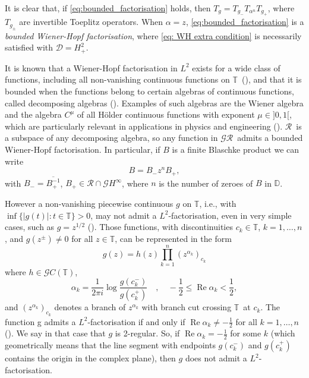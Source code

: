 \documentclass[12pt]{elsarticle}
\numberwithin{equation}{section}
\theoremstyle{plain}
\newcommand{\Hp}{\ensuremath{H^2_+}}
\newcommand{\Hinf}{\ensuremath{H^\infty}}
\newcommand{\TT}{\ensuremath{\mathbb{T}}}
\newcommand{\DD}{\ensuremath{\mathbb{D}}}
\newcommand{\GG}{\ensuremath{\mathcal{G}}}
\newcommand{\RR}{\ensuremath{\mathcal{R}}}
\newcommand{\ol}[1]{\ensuremath{\overline{#1}}}
\renewcommand{\Re}{\ensuremath{\operatorname{Re}}}
\begin{document}
It is clear that, if \eqref{eq:bounded_factorisation} holds, then $T_g = T_{g_-} T_{\alpha^n} T_{g_+}$, where $T_{g_\pm}$ are invertible Toeplitz operators.
When $\alpha = z$, \eqref{eq:bounded_factorisation} is a {\em bounded Wiener-Hopf factorisation}, where \eqref{eq: WH extra condition} is necessarily satisfied with $\mathcal{D} = \Hp$.


It is known that a Wiener-Hopf factorisation in $L^2$ exists for a wide class of functions, including all non-vanishing continuous functions on \TT\ (\cite{GoKru92,MiPro86}), and that it is bounded when the functions belong to certain algebras of continuous functions, called decomposing algebras (\cite{MiPro86}).
Examples of such algebras are the Wiener algebra and the algebra $C^\mu$ of all H\"older continuous functions with exponent $\mu \in  ]0,1[$, which are particularly relevant in applications in physics and engineering (\cite{CamaraCardoso24,CamaraCardoso25,KiMi23,KiAbMiRo21}).
\RR\ is a subspace of any decomposing algebra, so any function in \GG\RR\ admits a bounded Wiener-Hopf factorisation.
In particular, if $B$ is a finite Blaschke product we can write
\begin{equation}
\label{eq:B-WH.fact}
B = B_- z^n B_+,
\end{equation}
with $B_- = \ol{B_+^{-1}}$, $B_+ \in \RR\cap\GG\Hinf$, where $n$ is the number of zeroes of $B$ in \DD.


However a non-vanishing piecewise continuous $g$ on \TT, i.e., with $\inf \{|g(t)| : t\in\TT \} > 0$, may not admit a $L^2$-factorisation, even in very simple cases, such as $g=z^{1/2}$ (\cite[Thm 2.5]{LitSpit87}).
Those functions, with discontinuities $c_k\in\TT$, $k=1,\dots,n$, and $g(z^\pm)\neq 0$ for all $z\in\TT$, can be represented in the form
\begin{equation}
\label{eq:piecewise.cont.decomposition}
g(z) = h(z) \prod_{k=1}^n (z^{\alpha_k})_{c_k}
\end{equation}
where $h\in \GG C(\TT)$, 
\begin{equation*}
\alpha_k = \frac{1}{2 \pi i} \log \frac{g(c_k^-)}{g(c_k^+)} \quad , \quad -\frac{1}{2} \leq \Re \alpha_k < \frac{1}{2},
\end{equation*}
and $(z^{\alpha_k})_{c_k}$ denotes a branch of $z^{\alpha_k}$ with branch cut crossing \TT\ at $c_k$.
The function g admits a $L^2$-factorisation if and only if $\Re \alpha_k \neq -\frac{1}{2}$ for all $k=1,\dots,n$ (\cite[Lemma 4.1]{Dudu79}).
We say in that case that $g$ is 2-regular.
So, if $\Re \alpha_k = -\frac{1}{2}$ for some $k$ (which geometrically means that the line segment with endpoints $g(c_k^-)$ and $g(c_k^+)$ contains the origin in the complex plane), then $g$ does not admit a $L^2$- factorisation.
\end{document}
